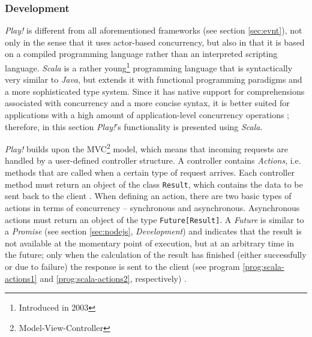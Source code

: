 \subsubsection*{Development}
\textit{Play!} is different from all aforementioned frameworks (see section \ref{sec:evnt}), not only in the sense that it uses actor-based concurrency, but also in that it is based on a compiled programming language rather than an interpreted scripting language. \textit{Scala} is a rather young\footnote{Introduced in 2003} programming language that is syntactically very similar to \textit{Java}, but extends it with functional programming paradigms and a more sophisticated type system. Since it has native support for comprehensions associated with concurrency and a more concise syntax, it is better suited for applications with a high amount of application-level concurrency operations \cite[p. 9]{Scala}; therefore, in this section \textit{Play!}'s functionality is presented using \textit{Scala}.

\textit{Play!} builds upon the MVC\footnote{Model-View-Controller} model, which means that incoming requests are handled by a user-defined controller structure. A controller contains \textit{Actions}, i.e. methods that are called when a certain type of request arrives. Each controller method must return an object of the class \texttt{Result}, which contains the data to be sent back to the client \cite[p. 27]{Reelsen2011}. When defining an action, there are two basic types of actions in terms of concurrency -- synchronous and asynchronous. Asynchronous actions must return an object of the type \texttt{Future[Result]}. A \textit{Future} is similar to a \textit{Promise} (see section \ref{sec:nodejs}, \textit{Development}) and indicates that the result is not available at the momentary point of execution, but at an arbitrary time in the future; only when the calculation of the result has finished (either successfully or due to failure) the response is sent to the client (see program \ref{prog:scala-actions1} and \ref{prog:scala-actions2}, respectively) \cite[p. 86]{Scala}. 


